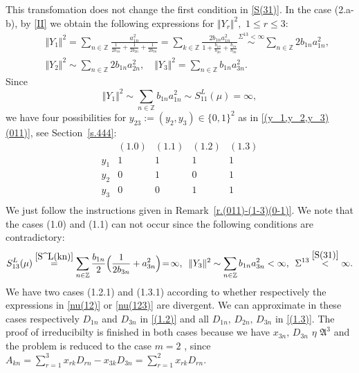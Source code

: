 \documentclass[preprint,12pt]{elsarticle}
\numberwithin{equation}{section}
\begin{document}
This transfomation does not change the first condition in \eqref{S(31)}.
In the case  (2.a-b), by \eqref{II}  we obtain the following  expressions for  $\Vert Y_r \Vert^2,\,\,1\leq r\leq 3$: 
%
\begin{eqnarray*}
 &&\Vert Y_1\Vert^2=\sum_{n\in \mathbb Z}\frac{a_{1n}^2}{\frac{1}{2b_{1n}}+\frac{1}{2b_{2n}}+\frac{1}{2b_{3n}}}= 
\sum_{k\in \mathbb Z}\frac{2b_{1n}a_{1n}^2}{1+\frac{b_{1n}}{b_{2n}}+\frac{b_{1n}}{b_{3n}}
}\stackrel{\Sigma^{13}<\infty}{\sim}
\sum_{n\in \mathbb Z}2b_{1n}a_{1n}^2,\\
&&\Vert Y_2 \Vert^2\sim
\sum_{n\in \mathbb Z}2b_{1n}a_{2n}^2,\quad
\Vert Y_3\Vert^2=
\sum_{n\in \mathbb Z}b_{1n}a_{3n}^2.
\end{eqnarray*}
Since
$$
\Vert Y_1 \Vert^2\sim
\sum_{n\in \mathbb Z}b_{1n}a_{1n}^2\sim S^L_{11}(\mu)=\infty,
$$ 
we have four possibilities 
for $y_{23}:=(y_2,y_3)\in \{0,1\}^2$ as in \eqref{(y_1,y_2,y_3)(011)}, see Section~\ref{s.444}:
\begin{equation*}
\begin{array}{ccccc}
   &(1.0)&(1.1)&(1.2)&(1.3)\\
y_1&1&1&1&1\\
y_2&0&1&0&1\\
y_3&0&0&1&1\\
\end{array}
\end{equation*}
We just follow the instructions given in Remark~\ref{r.(011)-(1-3)(0-1)}.
We note that the cases (1.0) and (1.1) can not occur since the following conditions are contradictory:
%
$$
S^L_{13}(\mu)\stackrel{\eqref{S^L(kn)} }{=}\sum_{n\in{\mathbb
Z}}\frac{b_{1n}}{2}\Big(\frac{1}{2b_{3n}}+a_{3n}^2\Big)\!=\!\infty, \,\,\,\Vert Y_3\Vert^2\sim \sum_{n\in \mathbb Z}b_{1n}a_{3n}^2<\infty,\,\,\, \Sigma^{13}\stackrel{\eqref{S(31)}}{<}\infty.
$$
We have two cases  (1.2.1) and (1.3.1) according to whether respectively the expressions in
\eqref{nu(12)} 
 or \eqref{nu(123)} are 
divergent. We can approximate in these cases respectively  
$D_{1n}$ and $D_{3n}$ in \eqref{(1.2)}  and all $D_{1n},\,D_{2n},\,D_{3n}$ in \eqref{(1.3)}. The proof of irreducibilty is finished in both cases
because we have  
$x_{3n},\,D_{3n}\,\,\eta\,\, {\mathfrak A}^3$ 
%
and the problem is reduced to the case $m=2$ \cite{KosJFA17}, since
$
A_{kn}\!=\!\sum_{r=1}^{3}x_{rk}D_{rn}-x_{3k}D_{3n}=
\sum_{r=1}^{2}x_{rk}D_{rn}.
$
\end{document}
